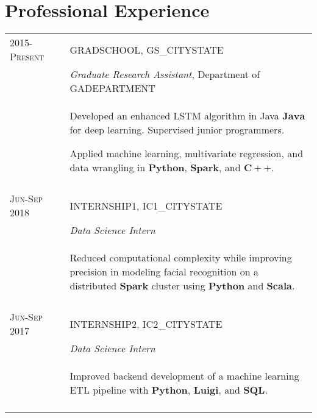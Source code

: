 \documentclass[a4paper,10pt]{article}
\begin{document}
\section{Professional Experience}
\begin{supertabular}{l p{0.55cm} p{13.9cm}}
	\textsc{2015-Present}				&& \textsc{GRADSCHOOL}, GS_CITYSTATE \\
	\small\textsc{}							&& \small	\emph{Graduate Research Assistant}, Department of GADEPARTMENT \\
															&& \begin{enumerate*}[label =$\diamond$,itemjoin={\newline}]
																	\item \footnotesize Developed an enhanced LSTM algorithm in Java $\mathbf{Java}$ for deep learning. Supervised junior programmers.
																	\item \footnotesize Applied machine learning, multivariate regression, and data wrangling in $\mathbf{Python}$, $\mathbf{Spark}$, and $\mathbf{C++}$.
																	\end{enumerate*} \vspace{2mm} \\

	 \\

	\textsc{Jun-Sep 2018}	&& \textsc{INTERNSHIP1}, IC1_CITYSTATE \\
												&& \small	\emph{Data Science Intern} \\
												&& \begin{enumerate*}[label =$\diamond$, itemjoin={\newline}]
														\item \footnotesize Reduced computational complexity while improving precision in modeling facial recognition on a distributed $\mathbf{Spark}$ cluster using $\mathbf{Python}$ and $\mathbf{Scala}$.														\end{enumerate*} \\
	 \\
	



	\textsc{Jun-Sep 2017}	&& \textsc{INTERNSHIP2}, IC2_CITYSTATE \\
												&& \small	\emph{Data Science Intern} \\
												&& \begin{enumerate*}[label =$\diamond$, itemjoin={\newline}]
														\item \footnotesize Improved backend development of a machine learning ETL pipeline with $\mathbf{Python}$, $\mathbf{Luigi}$, and $\mathbf{SQL}$.														\end{enumerate*} \\
	 \\
	



\end{supertabular}
\end{document}
